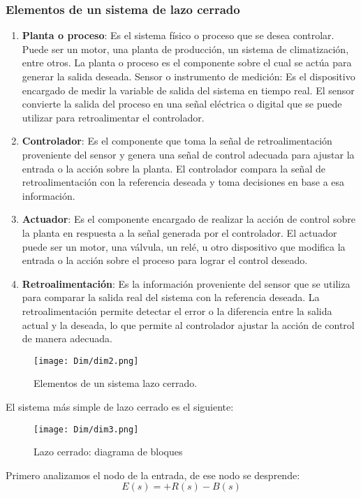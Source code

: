 \documentclass[
	12pt, %
	fleqn, %
	a4paper, %
	oneside, %
]{LegrandOrangeBook}
\begin{document}
\subsubsection{Elementos de un sistema de lazo cerrado}
\begin{enumerate}
\item \textbf{Planta o proceso}: Es el sistema físico o proceso que se desea controlar. Puede ser un motor, una planta de producción, un sistema de climatización, entre otros. La planta o proceso es el componente sobre el cual se actúa para generar la salida deseada.
Sensor o instrumento de medición: Es el dispositivo encargado de medir la variable de salida del sistema en tiempo real. El sensor convierte la salida del proceso en una señal eléctrica o digital que se puede utilizar para retroalimentar el controlador.
\item \textbf{Controlador}: Es el componente que toma la señal de retroalimentación proveniente del sensor y genera una señal de control adecuada para ajustar la entrada o la acción sobre la planta. El controlador compara la señal de retroalimentación con la referencia deseada y toma decisiones en base a esa información.
\item \textbf{Actuador}: Es el componente encargado de realizar la acción de control sobre la planta en respuesta a la señal generada por el controlador. El actuador puede ser un motor, una válvula, un relé, u otro dispositivo que modifica la entrada o la acción sobre el proceso para lograr el control deseado.
\item \textbf{Retroalimentación}: Es la información proveniente del sensor que se utiliza para comparar la salida real del sistema con la referencia deseada. La retroalimentación permite detectar el error o la diferencia entre la salida actual y la deseada, lo que permite al controlador ajustar la acción de control de manera adecuada.
\end{enumerate}
\begin{figure}[H]
\centering
\texttt{[image: Dim/dim2.png]}
\caption{Elementos de un sistema lazo cerrado.}
\end{figure}
El sistema más simple de lazo cerrado es el siguiente:
\begin{figure}[H]
\centering
\texttt{[image: Dim/dim3.png]}
\caption{Lazo cerrado: diagrama de bloques}
\end{figure}
Primero analizamos el nodo de la entrada, de ese nodo se desprende:
\begin{equation}
E(s)=+R(s)-B(s)
\end{equation}
\end{document}
